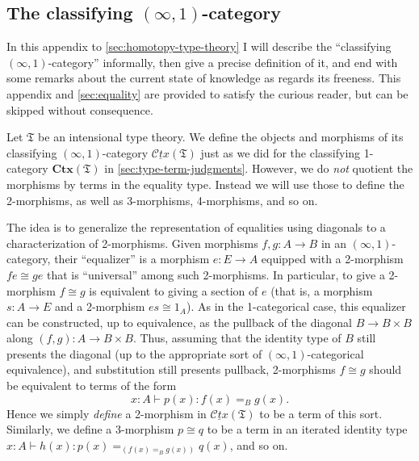 \documentclass[10pt]{article}
\def\oo{\ensuremath{\infty}}
\def\io{\ensuremath{(\oo,1)}}
\def\types{\vdash}
\def\fT{\mathfrak{T}}
\def\CtxT{\mathbf{Ctx}(\fT)}
\def\cCtx{\underline{\mathscr{C}\!\mathit{tx}}}
\def\cCtxT{\cCtx(\fT)}
\numberwithin{equation}{section}
\begin{document}
\begin{subappendices}

\subsection{The classifying \io-category}
\label{sec:semantics}

In this appendix to \cref{sec:homotopy-type-theory} I will describe the ``classifying \io-category'' informally, then give a precise definition of it, and end with some remarks about the current state of knowledge as regards its freeness.
This appendix and \cref{sec:equality} are provided to satisfy the curious reader, but can be skipped without consequence.

Let $\fT$ be an intensional type theory.
We define the objects and morphisms of its classifying $\io$-category $\cCtxT$ just as we did for the classifying 1-category $\CtxT$ in \cref{sec:type-term-judgments}.
However, we do \emph{not} quotient the morphisms by terms in the equality type.
Instead we will use those to define the 2-morphisms, as well as 3-morphisms, 4-morphisms, and so on.

The idea is to generalize the representation of equalities using diagonals to a characterization of 2-morphisms.
Given morphisms $f,g:A\to B$ in an $\io$-category, their ``equalizer'' is a morphism $e:E\to A$ equipped with a 2-morphism $f e \cong g e$ that is ``universal'' among such 2-morphisms.
In particular, to give a 2-morphism $f\cong g$ is equivalent to giving a section of $e$ (that is, a morphism $s:A\to E$ and a 2-morphism $e s \cong 1_A$).
As in the 1-categorical case, this equalizer can be constructed, up to equivalence, as the pullback of the diagonal $B\to B\times B$ along $(f,g):A\to B\times B$.
Thus, assuming that the identity type of $B$ still presents the diagonal (up to the appropriate sort of $\io$-categorical equivalence), and substitution still presents pullback, 2-morphisms $f\cong g$ should be equivalent to terms of the form
\begin{equation}
  x:A \types p(x):f(x)=_B g(x).\label{eq:ctx-2mor}
\end{equation}
Hence we simply \emph{define} a 2-morphism in $\cCtxT$ to be a term of this sort.
Similarly, we define a 3-morphism $p\cong q$ to be a term in an iterated identity type $x:A \types h(x):p(x)=_{(f(x)=_B g(x))} q(x)$, and so on.


\end{subappendices}
\end{document}
